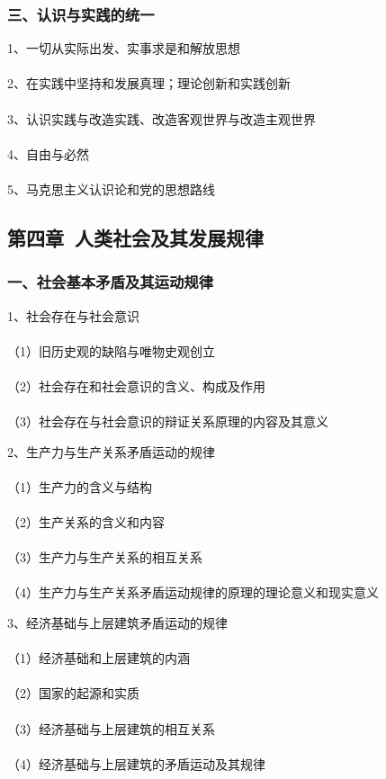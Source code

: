 \documentclass{ctexart}
\begin{document}
\subsubsection{三、认识与实践的统一}
1、一切从实际出发、实事求是和解放思想
\\\\

2、在实践中坚持和发展真理；理论创新和实践创新
\\\\

3、认识实践与改造实践、改造客观世界与改造主观世界
\\\\

4、自由与必然
\\\\

5、马克思主义认识论和党的思想路线

\subsection{第四章\ 人类社会及其发展规律}
\subsubsection{一、社会基本矛盾及其运动规律}
1、社会存在与社会意识
\\\\
（1）旧历史观的缺陷与唯物史观创立
\\\\
（2）社会存在和社会意识的含义、构成及作用
\\\\
（3）社会存在与社会意识的辩证关系原理的内容及其意义

2、生产力与生产关系矛盾运动的规律
\\\\
（1）生产力的含义与结构
\\\\
（2）生产关系的含义和内容
\\\\
（3）生产力与生产关系的相互关系
\\\\
（4）生产力与生产关系矛盾运动规律的原理的理论意义和现实意义

3、经济基础与上层建筑矛盾运动的规律
\\\\
（1）经济基础和上层建筑的内涵
\\\\
（2）国家的起源和实质
\\\\
（3）经济基础与上层建筑的相互关系
\\\\
（4）经济基础与上层建筑的矛盾运动及其规律
\end{document}
